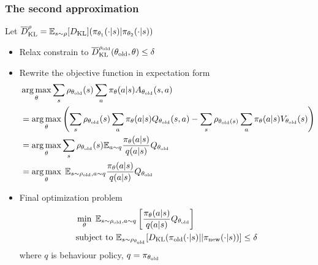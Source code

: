 \documentclass[9pt]{beamer}
\DeclareMathOperator*{\argmax}{arg\,max}
\theoremstyle{remark}
\begin{document}
\begin{frame}
    \frametitle{The second approximation}
    Let $\overline{D}_{\rm KL}^{\rho} = \mathbb{E}_{s \sim \rho} [D_{\rm KL}] (\pi_{\theta_1} (\cdot|s)| \pi_{\theta_2}(\cdot|s))$
    \begin{itemize}
        \item Relax constrain to $ \overline{D}^{\rho_{\rm old}}_{\rm KL} (\theta_{\rm old}, \theta) \leq \delta $ 
        \item Rewrite the objective function in expectation form
            \begin{align*}
                &\argmax_{\theta} \sum_{s} \rho_{\theta_{\rm old}}(s)\sum_{a} \pi_{\theta}(a|s) A_{\theta_{\rm old}}(s, a)  \\
                &= \argmax_{\theta} \left(  \sum_{s} \rho_{\theta_{\rm old}}(s) \sum_{a} \pi_{\theta}(a|s) Q_{\theta_{\rm old}}(s,a) - \sum_{s} \rho_{\theta_{\rm old}(s)} \sum_{a} \pi_{\theta}(a|s) V_{\theta_{\rm old}}(s) \right)\\
                &= \argmax_{\theta} \sum_{s} \rho_{\theta_{\rm old}}(s) \mathbb{E}_{a \sim q} \dfrac{\pi_{\theta}(a|s)}{q(a|s)}Q_{\theta_{\rm old}} \\
                &= \argmax_{\theta} \; \mathbb{E}_{s \sim \rho_{\rm old}, a \sim q} \dfrac{\pi_{\theta}(a|s)}{q(a|s)}Q_{\theta_{\rm old}} \\
            \end{align*}
        \item Final optimization problem
            \begin{align*}
                &\min_{\theta} \; \mathbb{E}_{s \sim \rho_{\rm old}, a \sim q} \left[  \dfrac{\pi_{\theta}(a|s)}{q(a|s)}Q_{\theta_{\rm old}}\right] \\
                &\text{subject to } \mathbb{E}_{s \sim \rho_{\theta_{\rm old}}} [D_{\rm KL}(\pi_{\rm old}( \cdot| s ) || \pi_{\rm new}( \cdot| s ))] \leq \delta
            \end{align*}
            where $q$ is behaviour policy,  $q = \pi_{\theta_{\rm old}}$
    \end{itemize}
\end{frame}
\end{document}
